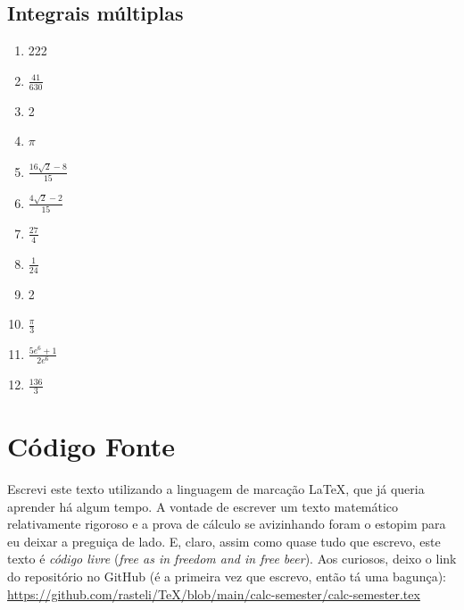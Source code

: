 \documentclass[a4paper, 12pt]{extreport}
\newcommand{\latex}{\LaTeX{}}
\begin{document}
    \section*{Integrais múltiplas}
      \begin{multicols}{4}
        \begin{enumerate}
          \item 222
          \item $\frac{41}{630}$
          \item 2
          \item $\pi$
          \item $\frac{16\sqrt{2}-8}{15}$
          \item $\frac{4\sqrt{2}-2}{15}$
          \item $\frac{27}{4}$
          \item $\frac{1}{24}$
          \item 2
          \item $\frac{\pi}{3}$
          \item $\frac{5e^6+1}{2e^6}$
          \item $\frac{136}{3}$
        \end{enumerate}
      \end{multicols}

  \chapter{\texorpdfstring{Código Fonte}{TEXT}{}} \label{snd_app}
    Escrevi este texto utilizando a linguagem de marcação \latex, que já queria aprender há algum tempo. A vontade de escrever
    um texto matemático relativamente rigoroso e a prova de cálculo se avizinhando foram o estopim para eu deixar a preguiça de lado.
    E, claro, assim como quase tudo que escrevo, este texto é \textsl{código livre} (\textsl{free as in freedom and in free beer}).
    Aos curiosos, deixo o link do repositório no GitHub (é a primeira vez que escrevo, então tá uma bagunça): \url{https://github.com/rasteli/TeX/blob/main/calc-semester/calc-semester.tex}
\end{document}
